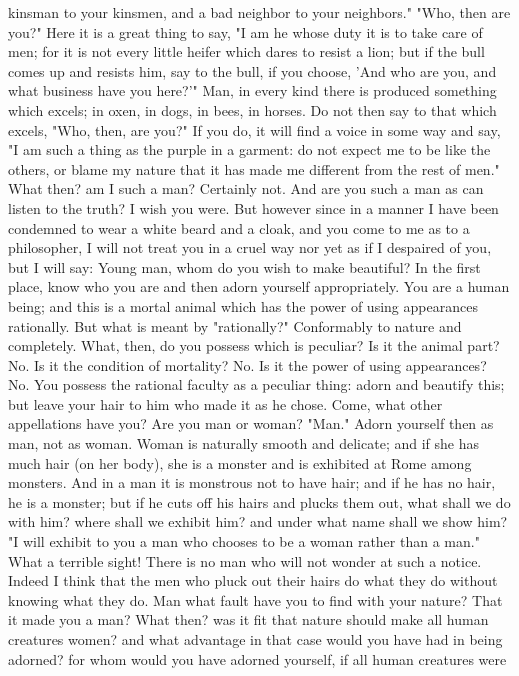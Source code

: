 \documentclass[a4paper]{article}
\begin{document}
kinsman to your kinsmen, and a bad neighbor to your neighbors." "Who, then are
you?" Here it is a great thing to say, "I am he whose duty it is to take care
of men; for it is not every little heifer which dares to resist a lion; but if
the bull comes up and resists him, say to the bull, if you choose, 'And who are
you, and what business have you here?'" Man, in every kind there is produced
something which excels; in oxen, in dogs, in bees, in horses. Do not then say
to that which excels, "Who, then, are you?" If you do, it will find a voice in
some way and say, "I am such a thing as the purple in a garment: do not expect
me to be like the others, or blame my nature that it has made me different from
the rest of men."
    What then? am I such a man? Certainly not. And are you such a man as can
listen to the truth? I wish you were. But however since in a manner I have been
condemned to wear a white beard and a cloak, and you come to me as to a
philosopher, I will not treat you in a cruel way nor yet as if I despaired of
you, but I will say: Young man, whom do you wish to make beautiful? In the
first place, know who you are and then adorn yourself appropriately. You are a
human being; and this is a mortal animal which has the power of using
appearances rationally. But what is meant by "rationally?" Conformably to
nature and completely. What, then, do you possess which is peculiar? Is it the
animal part? No. Is it the condition of mortality? No. Is it the power of using
appearances? No. You possess the rational faculty as a peculiar thing: adorn
and beautify this; but leave your hair to him who made it as he chose. Come,
what other appellations have you? Are you man or woman? "Man." Adorn yourself
then as man, not as woman. Woman is naturally smooth and delicate; and if she
has much hair (on her body), she is a monster and is exhibited at Rome among
monsters. And in a man it is monstrous not to have hair; and if he has no hair,
he is a monster; but if he cuts off his hairs and plucks them out, what shall
we do with him? where shall we exhibit him? and under what name shall we show
him? "I will exhibit to you a man who chooses to be a woman rather than a man."
What a terrible sight! There is no man who will not wonder at such a notice.
Indeed I think that the men who pluck out their hairs do what they do without
knowing what they do. Man what fault have you to find with your nature? That it
made you a man? What then? was it fit that nature should make all human
creatures women? and what advantage in that case would you have had in being
adorned? for whom would you have adorned yourself, if all human creatures were
\end{document}
